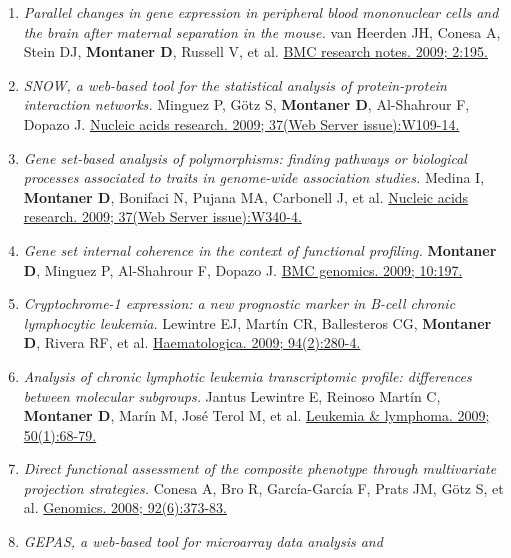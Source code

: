\begin{enumerate}
{  subtypes.} Bediaga NG, Acha-Sagredo A, Guerra I, Viguri A, Albaina C,
  et al. \href{http://www.ncbi.nlm.nih.gov//pubmed/20920229}{Breast
  cancer research : BCR. 2010; 12(5):R77.}
\item
  \emph{Parallel changes in gene expression in peripheral blood
  mononuclear cells and the brain after maternal separation in the
  mouse.} van Heerden JH, Conesa A, Stein DJ, \textbf{Montaner D},
  Russell V, et al.
  \href{http://www.ncbi.nlm.nih.gov//pubmed/19781058}{BMC research
  notes. 2009; 2:195.}
\item
  \emph{SNOW, a web-based tool for the statistical analysis of
  protein-protein interaction networks.} Minguez P, Götz S,
  \textbf{Montaner D}, Al-Shahrour F, Dopazo J.
  \href{http://www.ncbi.nlm.nih.gov//pubmed/19454602}{Nucleic acids
  research. 2009; 37(Web Server issue):W109-14.}
\item
  \emph{Gene set-based analysis of polymorphisms: finding pathways or
  biological processes associated to traits in genome-wide association
  studies.} Medina I, \textbf{Montaner D}, Bonifaci N, Pujana MA,
  Carbonell J, et al.
  \href{http://www.ncbi.nlm.nih.gov//pubmed/19502494}{Nucleic acids
  research. 2009; 37(Web Server issue):W340-4.}
\item
  \emph{Gene set internal coherence in the context of functional
  profiling.} \textbf{Montaner D}, Minguez P, Al-Shahrour F, Dopazo J.
  \href{http://www.ncbi.nlm.nih.gov//pubmed/19397819}{BMC genomics.
  2009; 10:197.}
\item
  \emph{Cryptochrome-1 expression: a new prognostic marker in B-cell
  chronic lymphocytic leukemia.} Lewintre EJ, Martín CR, Ballesteros CG,
  \textbf{Montaner D}, Rivera RF, et al.
  \href{http://www.ncbi.nlm.nih.gov//pubmed/19181792}{Haematologica.
  2009; 94(2):280-4.}
\item
  \emph{Analysis of chronic lymphotic leukemia transcriptomic profile:
  differences between molecular subgroups.} Jantus Lewintre E, Reinoso
  Martín C, \textbf{Montaner D}, Marín M, José Terol M, et al.
  \href{http://www.ncbi.nlm.nih.gov//pubmed/19127482}{Leukemia \&
  lymphoma. 2009; 50(1):68-79.}
\item
  \emph{Direct functional assessment of the composite phenotype through
  multivariate projection strategies.} Conesa A, Bro R, García-García F,
  Prats JM, Götz S, et al.
  \href{http://www.ncbi.nlm.nih.gov//pubmed/18652888}{Genomics. 2008;
  92(6):373-83.}
\item
  \emph{GEPAS, a web-based tool for microarray data analysis and
}
\end{enumerate}
